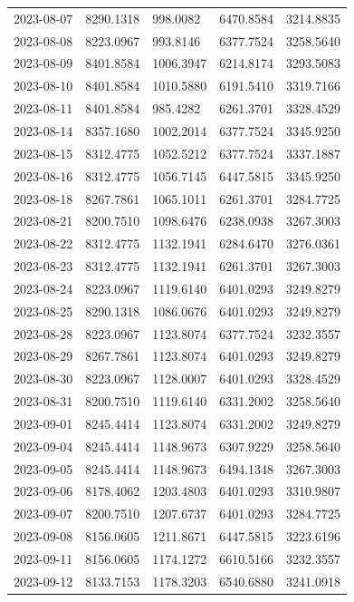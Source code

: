 \begin{footnotesize}
\begin{longtable}{lllll}
2023-08-07 & 8290.1318 & 998.0082 & 6470.8584 & 3214.8835 \\
2023-08-08 & 8223.0967 & 993.8146 & 6377.7524 & 3258.5640 \\
2023-08-09 & 8401.8584 & 1006.3947 & 6214.8174 & 3293.5083 \\
2023-08-10 & 8401.8584 & 1010.5880 & 6191.5410 & 3319.7166 \\
2023-08-11 & 8401.8584 & 985.4282 & 6261.3701 & 3328.4529 \\
2023-08-14 & 8357.1680 & 1002.2014 & 6377.7524 & 3345.9250 \\
2023-08-15 & 8312.4775 & 1052.5212 & 6377.7524 & 3337.1887 \\
2023-08-16 & 8312.4775 & 1056.7145 & 6447.5815 & 3345.9250 \\
2023-08-18 & 8267.7861 & 1065.1011 & 6261.3701 & 3284.7725 \\
2023-08-21 & 8200.7510 & 1098.6476 & 6238.0938 & 3267.3003 \\
2023-08-22 & 8312.4775 & 1132.1941 & 6284.6470 & 3276.0361 \\
2023-08-23 & 8312.4775 & 1132.1941 & 6261.3701 & 3267.3003 \\
2023-08-24 & 8223.0967 & 1119.6140 & 6401.0293 & 3249.8279 \\
2023-08-25 & 8290.1318 & 1086.0676 & 6401.0293 & 3249.8279 \\
2023-08-28 & 8223.0967 & 1123.8074 & 6377.7524 & 3232.3557 \\
2023-08-29 & 8267.7861 & 1123.8074 & 6401.0293 & 3249.8279 \\
2023-08-30 & 8223.0967 & 1128.0007 & 6401.0293 & 3328.4529 \\
2023-08-31 & 8200.7510 & 1119.6140 & 6331.2002 & 3258.5640 \\
2023-09-01 & 8245.4414 & 1123.8074 & 6331.2002 & 3249.8279 \\
2023-09-04 & 8245.4414 & 1148.9673 & 6307.9229 & 3258.5640 \\
2023-09-05 & 8245.4414 & 1148.9673 & 6494.1348 & 3267.3003 \\
2023-09-06 & 8178.4062 & 1203.4803 & 6401.0293 & 3310.9807 \\
2023-09-07 & 8200.7510 & 1207.6737 & 6401.0293 & 3284.7725 \\
2023-09-08 & 8156.0605 & 1211.8671 & 6447.5815 & 3223.6196 \\
2023-09-11 & 8156.0605 & 1174.1272 & 6610.5166 & 3232.3557 \\
2023-09-12 & 8133.7153 & 1178.3203 & 6540.6880 & 3241.0918 \\

\end{longtable}
\end{footnotesize}
